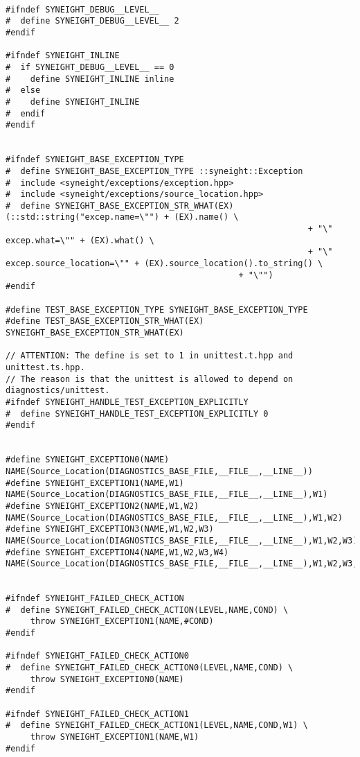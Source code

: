 \begin{verbatim}

#ifndef SYNEIGHT_DEBUG__LEVEL__
#  define SYNEIGHT_DEBUG__LEVEL__ 2
#endif

#ifndef SYNEIGHT_INLINE
#  if SYNEIGHT_DEBUG__LEVEL__ == 0
#    define SYNEIGHT_INLINE inline 
#  else
#    define SYNEIGHT_INLINE 
#  endif
#endif


#ifndef SYNEIGHT_BASE_EXCEPTION_TYPE
#  define SYNEIGHT_BASE_EXCEPTION_TYPE ::syneight::Exception
#  include <syneight/exceptions/exception.hpp>
#  include <syneight/exceptions/source_location.hpp>
#  define SYNEIGHT_BASE_EXCEPTION_STR_WHAT(EX) (::std::string("excep.name=\"") + (EX).name() \
                                                             + "\" excep.what=\"" + (EX).what() \
                                                             + "\" excep.source_location=\"" + (EX).source_location().to_string() \
                                               + "\"")
#endif

#define TEST_BASE_EXCEPTION_TYPE SYNEIGHT_BASE_EXCEPTION_TYPE
#define TEST_BASE_EXCEPTION_STR_WHAT(EX) SYNEIGHT_BASE_EXCEPTION_STR_WHAT(EX)

// ATTENTION: The define is set to 1 in unittest.t.hpp and unittest.ts.hpp.
// The reason is that the unittest is allowed to depend on diagnostics/unittest.
#ifndef SYNEIGHT_HANDLE_TEST_EXCEPTION_EXPLICITLY
#  define SYNEIGHT_HANDLE_TEST_EXCEPTION_EXPLICITLY 0
#endif


#define SYNEIGHT_EXCEPTION0(NAME) NAME(Source_Location(DIAGNOSTICS_BASE_FILE,__FILE__,__LINE__))
#define SYNEIGHT_EXCEPTION1(NAME,W1) NAME(Source_Location(DIAGNOSTICS_BASE_FILE,__FILE__,__LINE__),W1)
#define SYNEIGHT_EXCEPTION2(NAME,W1,W2) NAME(Source_Location(DIAGNOSTICS_BASE_FILE,__FILE__,__LINE__),W1,W2)
#define SYNEIGHT_EXCEPTION3(NAME,W1,W2,W3) NAME(Source_Location(DIAGNOSTICS_BASE_FILE,__FILE__,__LINE__),W1,W2,W3)
#define SYNEIGHT_EXCEPTION4(NAME,W1,W2,W3,W4) NAME(Source_Location(DIAGNOSTICS_BASE_FILE,__FILE__,__LINE__),W1,W2,W3,W4)


#ifndef SYNEIGHT_FAILED_CHECK_ACTION
#  define SYNEIGHT_FAILED_CHECK_ACTION(LEVEL,NAME,COND) \
     throw SYNEIGHT_EXCEPTION1(NAME,#COND)
#endif

#ifndef SYNEIGHT_FAILED_CHECK_ACTION0
#  define SYNEIGHT_FAILED_CHECK_ACTION0(LEVEL,NAME,COND) \
     throw SYNEIGHT_EXCEPTION0(NAME)
#endif

#ifndef SYNEIGHT_FAILED_CHECK_ACTION1
#  define SYNEIGHT_FAILED_CHECK_ACTION1(LEVEL,NAME,COND,W1) \
     throw SYNEIGHT_EXCEPTION1(NAME,W1)
#endif


\end{verbatim}
